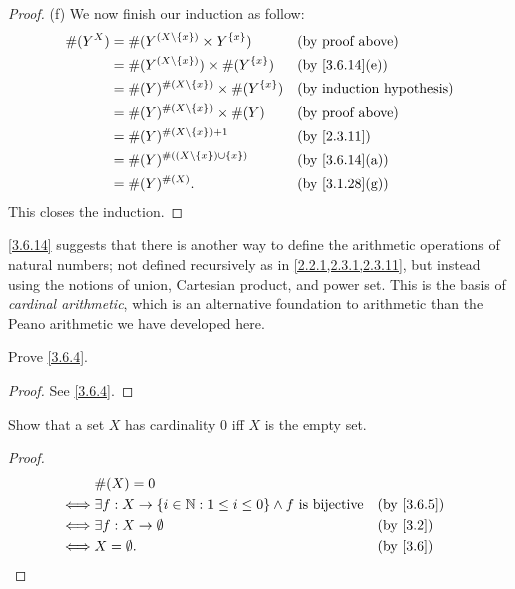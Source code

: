 \begin{proof}{(f)}
  We now finish our induction as follow:
  \begin{align*}
    \#(Y^X) & = \#(Y^{(X \setminus \set{x})} \times Y^{\set{x}})       &  & \text{(by proof above)}      \\
            & = \#(Y^{(X \setminus \set{x})}) \times \#(Y^{\set{x}})   &  & \text{(by \cref{3.6.14}(e))} \\
            & = \#(Y)^{\#(X \setminus \set{x})} \times \#(Y^{\set{x}}) &  & \byIH                        \\
            & = \#(Y)^{\#(X \setminus \set{x})} \times \#(Y)           &  & \text{(by proof above)}      \\
            & = \#(Y)^{\#(X \setminus \set{x}) + 1}                    &  & \by{2.3.11}                  \\
            & = \#(Y)^{\#((X \setminus \set{x}) \cup \set{x})}         &  & \text{(by \cref{3.6.14}(a))} \\
            & = \#(Y)^{\#(X)}.                                         &  & \text{(by \cref{3.1.28}(g))}
  \end{align*}
  This closes the induction.
\end{proof}

\begin{rmk}\label{3.6.15}
  \cref{3.6.14} suggests that there is another way to define the arithmetic operations of natural numbers;
  not defined recursively as in \cref{2.2.1,2.3.1,2.3.11}, but instead using the notions of union, Cartesian product, and power set.
  This is the basis of \emph{cardinal arithmetic}, which is an alternative foundation to arithmetic than the Peano arithmetic we have developed here.
\end{rmk}

\exercisesection

\begin{ex}\label{ex:3.6.1}
  Prove \cref{3.6.4}.
\end{ex}

\begin{proof}
  See \cref{3.6.4}.
\end{proof}

\begin{ex}\label{ex:3.6.2}
  Show that a set \(X\) has cardinality \(0\) iff \(X\) is the empty set.
\end{ex}

\begin{proof}
  \begin{align*}
         & \#(X) = 0                                                                                                   \\
    \iff & \exists f : X \to \set{i \in \N : 1 \leq i \leq 0} \land f \text{ is bijective} &  & \by{3.6.5}             \\
    \iff & \exists f : X \to \emptyset                                                     &  & \text{(by \cref{3.2})} \\
    \iff & X = \emptyset.                                                                  &  & \text{(by \cref{3.6})}
  \end{align*}
\end{proof}

